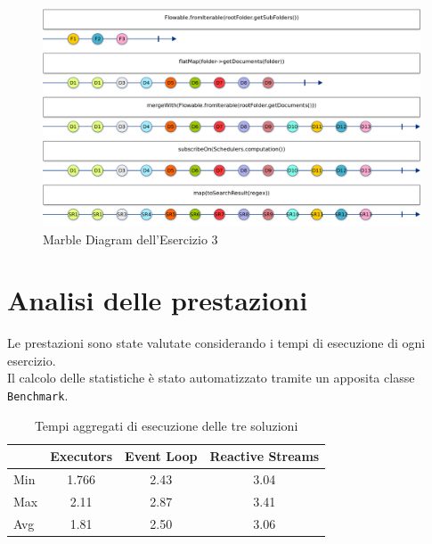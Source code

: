 \documentclass[a4paper]{article}
\begin{document}
\begin{figure}[H]

    \centering

    \includegraphics[width=\linewidth, height=\textheight,keepaspectratio]{ReactiveStreams}

    \caption{Marble Diagram dell'Esercizio 3}

    \label{fig:event-loop}

\end{figure}

\section{Analisi delle prestazioni}\label{analisi-delle-prestazioni}

Le prestazioni sono state valutate considerando i tempi di esecuzione di ogni esercizio.\\
Il calcolo delle statistiche \`e stato automatizzato tramite un apposita classe \texttt{Benchmark}.

\begin{table}[H]

\centering

\label{my-label}

\begin{tabular}{l|ccc}
\hline
    & Executors & Event Loop & Reactive Streams \\ \hline
Min & 1.766     & 2.43       & 3.04             \\
Max & 2.11      & 2.87       & 3.41             \\
Avg & 1.81      & 2.50       & 3.06             \\ \hline
\end{tabular}

\caption{Tempi aggregati di esecuzione delle tre soluzioni}

\label{Tabella speedup del sistema}

\end{table}

\end{document}
